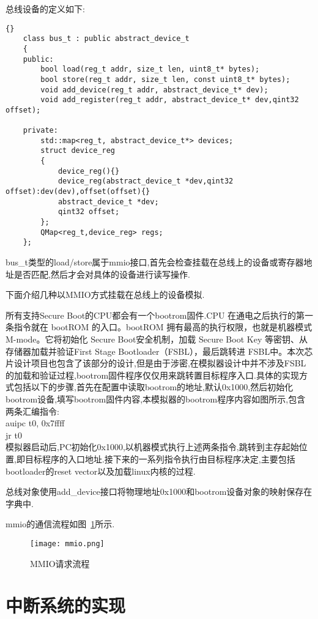 总线设备的定义如下:
\begin{lstlisting}{}
    class bus_t : public abstract_device_t
    {
    public:
        bool load(reg_t addr, size_t len, uint8_t* bytes);
        bool store(reg_t addr, size_t len, const uint8_t* bytes);
        void add_device(reg_t addr, abstract_device_t* dev);
        void add_register(reg_t addr, abstract_device_t* dev,qint32 offset);
    
    private:
        std::map<reg_t, abstract_device_t*> devices;
        struct device_reg
        {
            device_reg(){}
            device_reg(abstract_device_t *dev,qint32 offset):dev(dev),offset(offset){}
            abstract_device_t *dev;
            qint32 offset;
        };
        QMap<reg_t,device_reg> regs;
    };     
\end{lstlisting}

bus\_t类型的load/store属于mmio接口,首先会检查挂载在总线上的设备或寄存器地址是否匹配,然后才会对具体的设备进行读写操作.


下面介绍几种以MMIO方式挂载在总线上的设备模拟.


所有支持Secure Boot的CPU都会有一个bootrom固件.CPU 在通电之后执行的第一条指令就在 bootROM 的入口。bootROM 拥有最高的执行权限，也就是机器模式M-mode。它将初始化 Secure Boot安全机制，加载 Secure Boot Key 等密钥、从存储器加载并验证First Stage Bootloader（FSBL），最后跳转进 FSBL中。本次芯片设计项目也包含了该部分的设计,但是由于涉密,在模拟器设计中并不涉及FSBL的加载和验证过程,bootrom固件程序仅仅用来跳转置目标程序入口.具体的实现方式包括以下的步骤,首先在配置中读取bootrom的地址,默认0x1000,然后初始化bootrom设备,填写bootrom固件内容,本模拟器的bootrom程序内容如图所示,包含两条汇编指令:\\
auipc	t0, 0x7ffff\\
jr 	t0\\
模拟器启动后,PC初始化0x1000,以机器模式执行上述两条指令,跳转到主存起始位置,即目标程序的入口地址.接下来的一系列指令执行由目标程序决定,主要包括bootloader的reset vector以及加载linux内核的过程.


总线对象使用add\_device接口将物理地址0x1000和bootrom设备对象的映射保存在字典中.


mmio的通信流程如图~\ref{fig:mmio}所示.
\begin{figure}[h]
    \centering
    \texttt{[image: mmio.png]}
    \caption{MMIO请求流程}
    \label{fig:mmio}
\end{figure}


\section{中断系统的实现}

